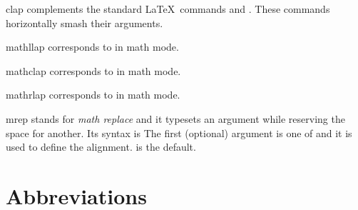 \documentclass[english,a4paper,DIV=12,parskip=full,oneside]{scrartcl}
\begin{document}
    \begin{commandlist}
        \item[clap] complements the standard \LaTeX\ commands \codeCommand{\llap} and \codeCommand{\rlap}.
            These commands horizontally smash their arguments.
            \par{}
            \par{}
            \par{}
        \item[mathllap] corresponds to \codeCommand{\llap} in math mode.
            \par{}
        \item[mathclap] corresponds to \codeCommand{\clap} in math mode.
            \par{}
        \item[mathrlap] corresponds to \codeCommand{\rlap} in math mode.
            \par{}
        \item[mrep] stands for \emph{math replace} and it typesets an argument while reserving the space for another.
            Its syntax is 
            The first (optional) argument is one of  and it is used to define the alignment.
             is the default.
            \par{}
            \par{}
            \par{}
    \end{commandlist}

    \section{Abbreviations}
        \label{sec:abbreviations}
\end{document}
